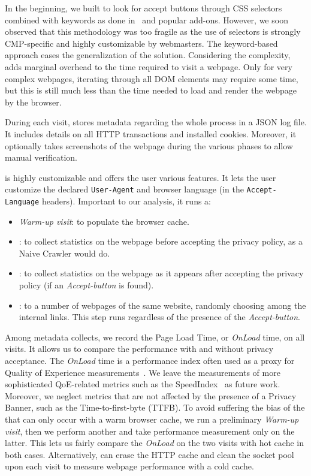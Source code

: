 In the beginning, we built \TOOL to look for accept buttons through CSS selectors combined with keywords as done in~\cite{vallina2019tales} and popular add-ons. However, we soon observed that this methodology was too fragile as the use of selectors is strongly CMP-specific and highly customizable by webmasters. The keyword-based approach eases the generalization of the solution. Considering the complexity, \TOOL adds marginal overhead to the time required to visit a webpage. Only for very complex webpages, iterating through all DOM elements may require some time, but this is still much less than the time needed to load and render the webpage by the browser. 

During each visit, \TOOL stores metadata regarding the whole process in a JSON log file. It includes details on all HTTP transactions and installed cookies. Moreover, it optionally takes screenshots of the webpage during the various phases to allow manual verification.

\TOOL is highly customizable and offers the user various features. It lets the user customize the declared \texttt{User-Agent} and browser language (in the \texttt{Accept-Language} headers). Important to our analysis, it runs a:
\begin{itemize}
    \item \emph{Warm-up visit}: to populate the browser cache.
    \item \BEFORE: to collect statistics on the webpage before accepting the privacy policy, as a Naive Crawler would do.
    \item \AFTER: to collect statistics on the webpage as it appears after accepting the privacy policy (if an \emph{Accept-button} is found).
    \item \INTERNAL: to a number of webpages of the same website, randomly choosing among the internal links. This step runs regardless of the presence of the \emph{Accept-button}.
\end{itemize}

Among metadata \TOOL collects, we record the Page Load Time, or \emph{OnLoad} time, on all visits. It allows us to compare the performance with and without privacy acceptance. The \emph{OnLoad} time is a performance index often used as a proxy for Quality of Experience measurements~\cite{da2018narrowing}. We leave the measurements of more sophisticated QoE-related metrics such as the SpeedIndex~\cite{speedindex} as future work. Moreover, we neglect metrics that are not affected by the presence of a Privacy Banner, such as the Time-to-first-byte (TTFB). To avoid suffering the bias of the \AFTER that can only occur with a warm browser cache, we run a preliminary \emph{Warm-up visit}, then we perform another \BEFORE and take performance measurement only on the latter. This lets us fairly compare the \emph{OnLoad} on the two visits with hot cache in both cases. Alternatively, \TOOL can erase the HTTP cache and clean the socket pool upon each visit to measure webpage performance with a cold cache.

